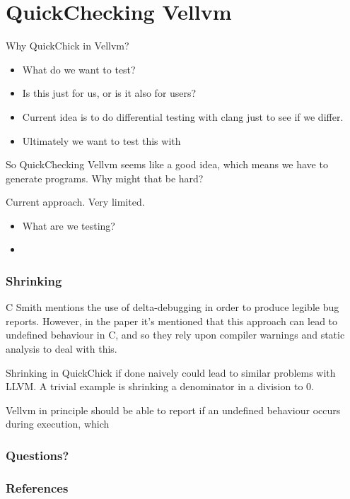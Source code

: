 \documentclass{beamer}
\begin{document}
\section{QuickChecking Vellvm}

\begin{frame}
  Why QuickChick in Vellvm?

  \begin{itemize}
  \item What do we want to test?
  \item Is this just for us, or is it also for users?
  \item Current idea is to do differential testing with clang just to
    see if we differ.
  \item Ultimately we want to test this with 
  \end{itemize}
\end{frame}

\begin{frame}
  So QuickChecking Vellvm seems like a good idea, which means we have
  to generate programs. Why might that be hard?
\end{frame}

\begin{frame}
  Current approach. Very limited.

  \begin{itemize}
  \item What are we testing?
  \item
  \end{itemize}
\end{frame}

\begin{frame}
  \frametitle{Shrinking}

  C Smith mentions the use of delta-debugging in order to produce
  legible bug reports. However, in the paper it's mentioned that this
  approach can lead to undefined behaviour in C, and so they rely upon
  compiler warnings and static analysis to deal with this.

  Shrinking in QuickChick if done naively could lead to similar
  problems with LLVM. A trivial example is shrinking a denominator in
  a division to 0.

  Vellvm in principle should be able to report if an undefined
  behaviour occurs during execution, which 
\end{frame}

\begin{frame}
  \frametitle{Questions?}

\end{frame}

\begin{frame}
  \frametitle{References}

  \nocite{*}
  \printbibliography
\end{frame}
\end{document}
